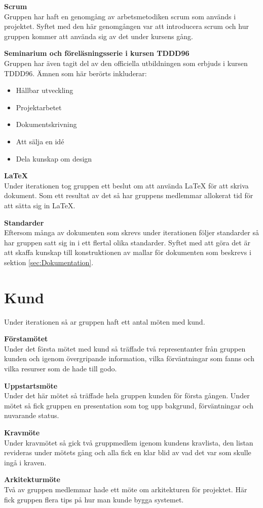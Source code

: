 \documentclass[a4paper,10pt]{article}
\begin{document}
\textbf{Scrum}\\ Gruppen har haft en genomgång av arbetsmetodiken scrum som används i projektet. Syftet med den här genomgången var att introducera scrum och hur gruppen kommer att använda sig av det under kursens gång.

\textbf{Seminarium och föreläsningsserie i kursen TDDD96}\\ Gruppen har även tagit del av den officiella utbildningen som erbjuds i kursen TDDD96. Ämnen som här berörts inkluderar:
\begin{itemize}
    \item Hållbar utveckling
    \item Projektarbetet
    \item Dokumentskrivning
    \item Att sälja en idé
    \item Dela kunskap om design
\end{itemize}

\textbf{\LaTeX}\\ Under iterationen tog gruppen ett beslut om att använda LaTeX för att skriva dokument. Som ett resultat av det så har gruppens medlemmar allokerat tid för att sätta sig in LaTeX.

\textbf{Standarder}\\ Eftersom många av dokumenten som skrevs under iterationen följer standarder så har gruppen satt sig in i ett flertal olika standarder. Syftet med att göra det är att skaffa kunskap till konstruktionen av mallar för dokumenten som beskrevs i sektion \ref{sec:Dokumentation}.

\section{Kund}
Under iterationen så ar gruppen haft ett antal möten med kund.

\textbf{Förstamötet}\\
Under det första mötet med kund så träffade två representanter från gruppen kunden och igenom övergripande information, vilka förväntningar som fanns och vilka resurser som de hade till godo.

\textbf{Uppstartsmöte}\\
Under det här mötet så träffade hela gruppen kunden för första gången. Under mötet så fick gruppen en presentation som tog upp bakgrund, förväntningar och nuvarande status.

\textbf{Kravmöte}\\
Under kravmötet så gick två gruppmedlem igenom kundens kravlista, den listan revideras under mötets gång och alla fick en klar blid av vad det var som skulle ingå i kraven.

\textbf{Arkitekturmöte}\\
Två av gruppen medlemmar hade ett möte om arkitekturen för projektet. Här fick gruppen flera tips på hur man kunde bygga systemet.
\end{document}
